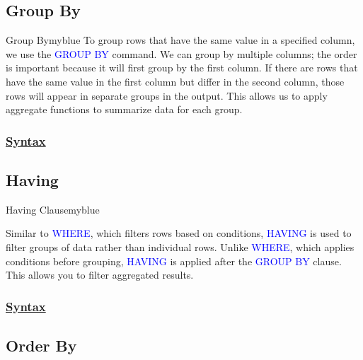 \vspace{0.5cm}
\subsection{Group By} 
\begin{prettyBox}{Group By}{myblue}
To group rows that have the same value in a specified column, we use the \textcolor{blue}{GROUP BY} command.
We can group by multiple columns; the order is important because it will first group by the first column. If there
are rows that have the same value in the first column but differ in the second column, those rows will appear in
separate groups in the output. This allows us to apply aggregate functions to summarize data for each group.
\end{prettyBox}

\vspace{0.25cm}
\subsubsection*{\underline{Syntax}}




\subsection{Having}
\begin{prettyBox}{Having Clause}{myblue}

    Similar to \textcolor{blue}{WHERE}, which filters rows based on conditions, 
\textcolor{blue}{HAVING} is used to filter groups of data rather than individual rows. Unlike
\textcolor{blue}{WHERE}, which applies conditions before grouping, \textcolor{blue}{HAVING} is
applied after the \textcolor{blue}{GROUP BY} clause. This allows you to filter aggregated results.
\end{prettyBox}


\vspace{0.25cm}
\subsubsection*{\underline{Syntax}}




\vspace{0.5cm}
\subsection{Order By}

